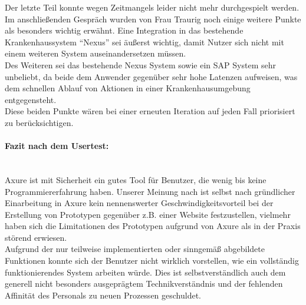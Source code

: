 \documentclass[a4paper, ngerman, 12pt]{scrartcl}
\begin{document}
Der letzte Teil konnte wegen Zeitmangels leider nicht mehr durchgespielt werden.\\
 
Im anschließenden Gespräch wurden von Frau Traurig noch einige weitere Punkte als besonders wichtig erwähnt. Eine Integration in das bestehende Krankenhaussystem “Nexus” sei äußerst wichtig, damit Nutzer sich nicht mit einem weiteren System auseinandersetzen müssen.\\

Des Weiteren sei das bestehende Nexus System sowie ein SAP System sehr unbeliebt, da beide dem Anwender gegenüber sehr hohe Latenzen aufweisen, was dem schnellen Ablauf von Aktionen in einer Krankenhausumgebung entgegensteht.\\
 
Diese beiden Punkte wären bei einer erneuten Iteration auf jeden Fall priorisiert zu berücksichtigen.

\paragraph{Fazit nach dem Usertest:}\leavevmode\\
Axure ist mit Sicherheit ein gutes Tool für Benutzer, die wenig bis keine Programmiererfahrung haben. Unserer Meinung nach ist selbst nach gründlicher Einarbeitung in Axure kein nennenswerter Geschwindigkeitsvorteil bei der Erstellung von Prototypen gegenüber z.B. einer Website festzustellen, vielmehr haben sich die Limitationen des Prototypen aufgrund von Axure als in der Praxis störend erwiesen.\\

Aufgrund der nur teilweise implementierten oder sinngemäß abgebildete Funktionen konnte sich der Benutzer nicht wirklich vorstellen, wie ein vollständig funktionierendes System arbeiten würde. Dies ist selbstverständlich auch dem generell nicht besonders ausgeprägtem Technikverständnis und der fehlenden Affinität des Personals zu neuen Prozessen geschuldet.
\end{document}
